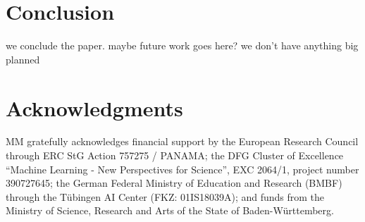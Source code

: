 \section{Conclusion}
we conclude the paper. maybe future work goes here? we don't have anything big planned

\section{Acknowledgments}
MM gratefully acknowledges financial support by the European Research Council through ERC StG Action 757275 / PANAMA; the DFG Cluster of Excellence “Machine Learning - New Perspectives for Science”, EXC 2064/1, project number 390727645; the German Federal Ministry of Education and Research (BMBF) through the T\"{u}bingen AI Center (FKZ: 01IS18039A); and funds from the Ministry of Science, Research and Arts of the State of Baden-W\"{u}rttemberg.
